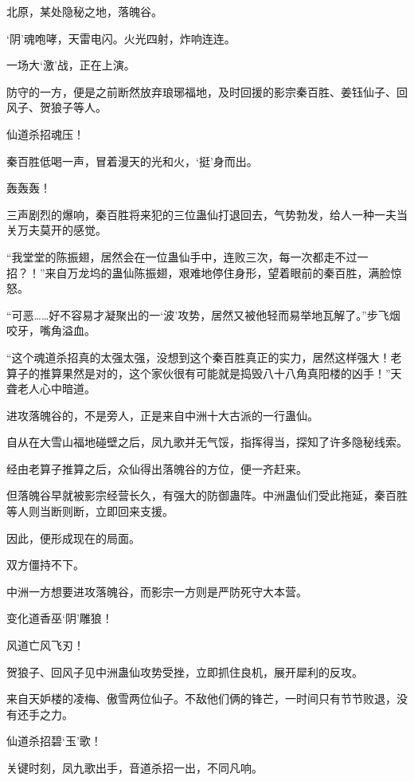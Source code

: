 
\begin{this_body}

北原，某处隐秘之地，落魄谷。

‘阴’魂咆哮，天雷电闪。火光四射，炸响连连。

一场大‘激’战，正在上演。

防守的一方，便是之前断然放弃琅琊福地，及时回援的影宗秦百胜、姜钰仙子、回风子、贺狼子等人。

仙道杀招魂压！

秦百胜低喝一声，冒着漫天的光和火，‘挺’身而出。

轰轰轰！

三声剧烈的爆响，秦百胜将来犯的三位蛊仙打退回去，气势勃发，给人一种一夫当关万夫莫开的感觉。

“我堂堂的陈振翅，居然会在一位蛊仙手中，连败三次，每一次都走不过一招？！”来自万龙坞的蛊仙陈振翅，艰难地停住身形，望着眼前的秦百胜，满脸惊怒。

“可恶……好不容易才凝聚出的一‘波’攻势，居然又被他轻而易举地瓦解了。”步飞烟咬牙，嘴角溢血。

“这个魂道杀招真的太强太强，没想到这个秦百胜真正的实力，居然这样强大！老算子的推算果然是对的，这个家伙很有可能就是捣毁八十八角真阳楼的凶手！”天聋老人心中暗道。

进攻落魄谷的，不是旁人，正是来自中洲十大古派的一行蛊仙。

自从在大雪山福地碰壁之后，凤九歌并无气馁，指挥得当，探知了许多隐秘线索。

经由老算子推算之后，众仙得出落魄谷的方位，便一齐赶来。

但落魄谷早就被影宗经营长久，有强大的防御蛊阵。中洲蛊仙们受此拖延，秦百胜等人则当断则断，立即回来支援。

因此，便形成现在的局面。

双方僵持不下。

中洲一方想要进攻落魄谷，而影宗一方则是严防死守大本营。

变化道香巫‘阴’雕狼！

风道亡风飞刃！

贺狼子、回风子见中洲蛊仙攻势受挫，立即抓住良机，展开犀利的反攻。

来自天妒楼的凌梅、傲雪两位仙子。不敌他们俩的锋芒，一时间只有节节败退，没有还手之力。

仙道杀招碧‘玉’歌！

关键时刻，凤九歌出手，音道杀招一出，不同凡响。


\end{this_body}
